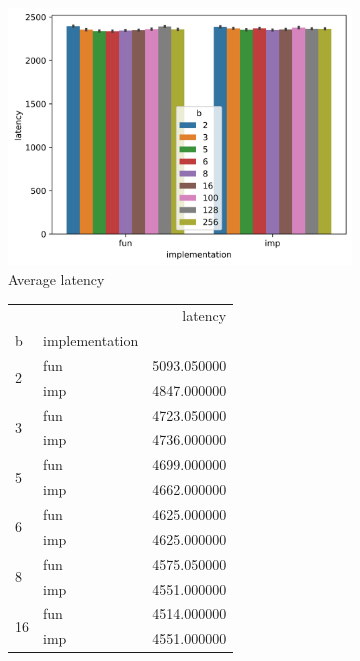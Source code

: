 \documentclass{article}
\begin{document}
\begin{figure}[h]
    \centering
    \begin{subfigure}[b]{0.6\textwidth}
        \centering
        \includegraphics[width=\textwidth]{average-map.png}
        \caption{Average latency}
    \end{subfigure}
    \begin{subfigure}[b]{0.3\textwidth}
        \centering
        \begin{tabular}{llr}
             &  & latency \\
            b & implementation &  \\
            \multirow[c]{2}{*}{2} & fun & 5093.050000 \\
             & imp & 4847.000000 \\
            \multirow[c]{2}{*}{3} & fun & 4723.050000 \\
             & imp & 4736.000000 \\
            \multirow[c]{2}{*}{5} & fun & 4699.000000 \\
             & imp & 4662.000000 \\
            \multirow[c]{2}{*}{6} & fun & 4625.000000 \\
             & imp & 4625.000000 \\
            \multirow[c]{2}{*}{8} & fun & 4575.050000 \\
             & imp & 4551.000000 \\
            \multirow[c]{2}{*}{16} & fun & 4514.000000 \\
             & imp & 4551.000000 \\

\end{tabular}
\end{subfigure}
\end{figure}
\end{document}
